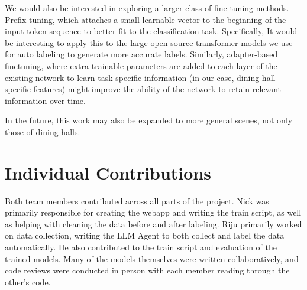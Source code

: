 \documentclass{article}
\begin{document}
\begin{multicols}{2}
We would also be interested in exploring a larger class of fine-tuning methods. Prefix tuning, which attaches a small learnable vector to the beginning of the input token sequence to better fit to the classification task. Specifically, It would be interesting to apply this to the large open-source transformer models we use for auto labeling to generate more accurate labels. Similarly, adapter-based finetuning, where extra trainable parameters are added to each layer of the existing network to learn task-specific information (in our case, dining-hall specific features) might improve the ability of the network to retain relevant information over time.

In the future, this work may also be expanded to more general scenes, not only those of dining halls.

\section*{Individual Contributions}
Both team members contributed across all parts of the project. Nick was primarily responsible for creating the webapp and writing the train script, as well as helping with cleaning the data before and after labeling. Riju primarily worked on data collection, writing the LLM Agent to both collect and label the data automatically. He also contributed to the train script and evaluation of the trained models. Many of the models themselves were written collaboratively, and code reviews were conducted in person with each member reading through the other’s code.

\end{multicols}

\newpage


\end{document}

